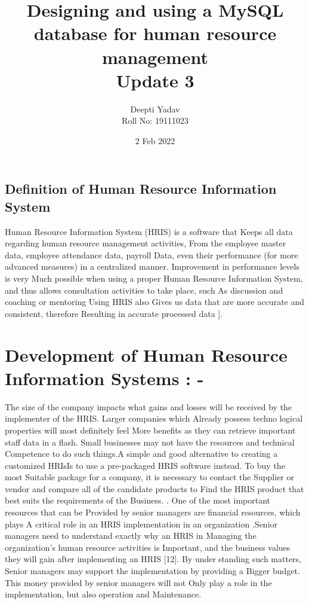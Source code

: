 \documentclass{article}
\title{ Designing and using a MySQL database for human resource management\\ Update 3}
\date{2 Feb 2022}
\author{Deepti Yadav\\ Roll No: 19111023 }
\begin{document}
\maketitle
\begin{center}
    \section*{Definition of Human Resource Information System}
\end{center}
Human Resource Information System (HRIS) is a software that Keeps all data regarding human resource management activities, From the employee master data, employee attendance data, payroll Data, even their performance (for more advanced measures) in a centralized manner. Improvement in performance levels is very Much possible when using a proper Human Resource Information System, and thus allows consultation activities to take place, such As discussion and coaching or mentoring   Using HRIS also Gives us data that are more accurate and consistent, therefore Resulting in accurate processed data ].
\\
\section*{Development of Human Resource Information
Systems : -}The size of the company impacts what gains and losses will be received by the
implementer of the HRIS. Larger companies which Already possess technological properties will most definitely feel More benefits as they can retrieve
important staff data in a flash. Small businesses may not have the resources
and technical Competence to do such things.A simple and good alternative to
creating a customized HRIsIs to use a pre-packaged HRIS software instead.
To buy the most Suitable package for a company, it is necessary to contact
the Supplier or vendor and compare all of the candidate products to Find
the HRIS product that best suits the requirements of the Business. . One of
the most important resources that can be Provided by senior managers are
financial resources, which plays A critical role in an HRIS implementation in
an organization .Senior managers need to understand exactly why an HRIS in
Managing the organization’s human resource activities is Important, and the
business values they will gain after implementing an HRIS [12]. By understanding such matters, Senior managers may support the implementation by
providing a Bigger budget. This money provided by senior managers will not
Only play a role in the implementation, but also operation and Maintenance.
\end{document}
